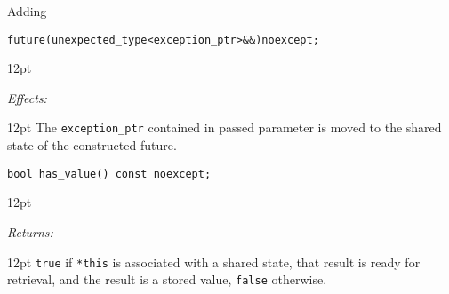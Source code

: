 \documentclass[a4paper,10pt]{article}
\newcommand{\cpp}[1]{\lstinline{#1}}
\newcommand{\wordingItem}[1]{\noindent\textit{#1:}}
\newenvironment{wordingPara}{\begin{adjustwidth}{12pt}{}}{\end{adjustwidth}}
\newenvironment{Effects}{\wordingItem{Effects}\vspace{7pt}\noindent\begin{adjustwidth}{12pt}{}}{\vspace{7pt}\end{adjustwidth}}
\newenvironment{Returns}{\wordingItem{Returns}\vspace{7pt}\noindent\begin{adjustwidth}{12pt}{}}{\vspace{7pt}\end{adjustwidth}}
\newcommand{\update}[1]{\colorbox{update_color}{#1}}
\begin{document}
\noindent
Adding

\begin{alltt}
\update{future(unexpected_type<exception_ptr>&&) noexcept; }
\end{alltt}

\begin{wordingPara}

\begin{Effects}
The \cpp{exception_ptr} contained in passed parameter is moved to the shared state of the constructed future. 
\end{Effects}

\end{wordingPara}

\begin{lstlisting}[xleftmargin=0pt]
bool has_value() const noexcept;
\end{lstlisting}

\begin{wordingPara}

\begin{Returns} \cpp{true} if \cpp{*this} is associated with a shared state, that result is ready for retrieval, and the result is a stored value, \cpp{false} otherwise.
\end{Returns}

\end{wordingPara}
\end{document}
